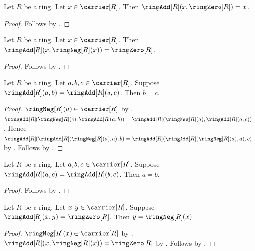 \begin{proposition}\label{ring_add_zero_right}
    Let $R$ be a ring.
    Let $x\in\carrier[R]$.
    Then $\ringAdd[R](x,\ringZero[R])=x$.
\end{proposition}
\begin{proof}
    Follows by
        .
\end{proof}

\begin{proposition}\label{ring_add_inverse_right}
    Let $R$ be a ring.
    Let $x\in\carrier[R]$.
    Then $\ringAdd[R](x,\ringNeg[R](x))=\ringZero[R]$.
\end{proposition}
\begin{proof}
    Follows by
        .
\end{proof}

\begin{theorem}\label{ring_add_cancel_left}
    Let $R$ be a ring.
    Let $a,b,c\in\carrier[R]$.
    Suppose $\ringAdd[R](a,b)=\ringAdd[R](a,c)$.
    Then $b=c$.
\end{theorem}
\begin{proof}
    $\ringNeg[R](a)\in\carrier[R]$ by .
    $\ringAdd[R](\ringNeg[R](a),\ringAdd[R](a,b))
        =\ringAdd[R](\ringNeg[R](a),\ringAdd[R](a,c))$.
    Hence
    $\ringAdd[R](\ringAdd[R](\ringNeg[R](a),a),b)
        =\ringAdd[R](\ringAdd[R](\ringNeg[R](a),a),c)$
        by .
    Follows by
        .
\end{proof}

\begin{theorem}\label{ring_add_cancel_right}
    Let $R$ be a ring.
    Let $a,b,c\in\carrier[R]$.
    Suppose $\ringAdd[R](a,c)=\ringAdd[R](b,c)$.
    Then $a=b$.
\end{theorem}
\begin{proof}
    Follows by
        .
\end{proof}

\begin{theorem}\label{ring_neg_unique}
    Let $R$ be a ring.
    Let $x,y\in\carrier[R]$.
    Suppose $\ringAdd[R](x,y)=\ringZero[R]$.
    Then $y=\ringNeg[R](x)$.
\end{theorem}
\begin{proof}
    $\ringNeg[R](x)\in\carrier[R]$ by .
    $\ringAdd[R](x,\ringNeg[R](x))=\ringZero[R]$
        by .
    Follows by .
\end{proof}

